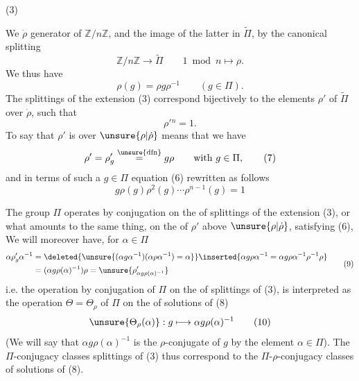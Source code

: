 (3) 

We  $\dot\rho$  generator of $\mathbb Z/n\mathbb Z$, and   the image of the latter in $\widetilde\Pi$, by the canonical splitting 
\[
\mathbb Z/n\mathbb Z\longrightarrow\widetilde\Pi\qquad 1\bmod n\longmapsto\rho. \tag{4}
\]
We thus have
\[
\rho(g)=\rho g\rho^{-1}\qquad(g\in\Pi). \tag{5}
\]
The splittings of the extension (3) correspond bijectively to the elements $\rho'$ of $\widetilde\Pi$ over $\dot\rho$, such that
\[
\rho'{}^n=1. \tag{6}
\]
To say that $\rho'$ is over $\unsure{\rho|\dot\rho}$ means that we have
\[
\rho'=\rho'_g\overset{\unsure{\mathrm{dfn}}}{=}g\rho\qquad\text{with }g\in\Pi, \tag{7}
\]
and in terms of such a $g\in\Pi$ equation (6)  rewritten as follows
\[
\boxed{g\rho(g)\rho^2(g)\cdots\rho^{n-1}(g)=1} \tag{8}
\]






The group $\Pi$ operates by conjugation on the  of splittings of the extension (3), or what amounts to the same thing, on the  of $\rho'$ above $\unsure{\rho|\dot\rho}$, satisfying (6),  We will moreover have, for $\alpha\in\Pi$
\[
\begin{aligned}
\alpha\rho'_g\alpha^{-1}
&=\deleted{\unsure{(\alpha g\alpha^{-1})(\alpha\rho\alpha^{-1})=\alpha}}\inserted{\alpha g\rho\alpha^{-1}=\alpha g\rho\alpha^{-1}\rho^{-1}\rho}\\
&=(\alpha g\rho(\alpha)^{-1})\rho
=\unsure{\rho'_{\alpha g\rho(\alpha)^{-1}}}
\end{aligned}\tag{9}
\]
i.e. the operation by conjugation of $\Pi$ on the  of splittings of (3), is interpreted as the operation $\Theta=\Theta_\rho$ of $\Pi$ on the  of solutions of (8) 
\[
\unsure{\Theta_\rho(\alpha)}:g\longmapsto\alpha g\rho(\alpha)^{-1} \tag{10}
\]
(We will say that $\alpha g\rho(\alpha)^{-1}$ is the $\rho$-conjugate of $g$ by the element $\alpha\in\Pi$). The $\Pi$-conjugacy classes  splittings of (3) thus correspond to the $\Pi$-$\rho$-conjugacy classes of solutions of (8).

